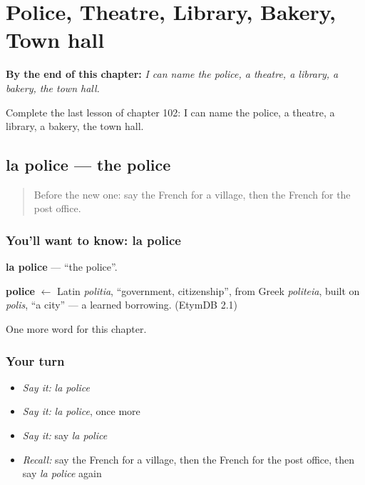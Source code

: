 
\chapter{Police, Theatre, Library, Bakery, Town hall}
\label{ch:fr-police-theatre-library-bakery-town-hall}

\begin{chapteropening}
\textbf{By the end of this chapter:} \emph{I can name the police, a theatre, a library, a bakery, the town hall.}

Complete the last lesson of chapter 102: I can name the police, a theatre, a library, a bakery, the town hall.
\end{chapteropening}

\section[la police]{la police — the police}

\label{lesson:FR-C102-police}



\begin{quote}
Before the new one: say the French for a village, then the French for the post office.
\end{quote}

\subsection*{You'll want to know: la police}
\textbf{la police} — \textquotedblleft{}the police\textquotedblright{}.

\begin{cousinweb}
\textbf{police} $\leftarrow$ Latin \emph{politia}, \textquotedblleft{}government, citizenship\textquotedblright{}, from Greek \emph{politeia}, built on \emph{polis}, \textquotedblleft{}a city\textquotedblright{} — a learned borrowing. (EtymDB 2.1)
\end{cousinweb}

\begin{grammarlens}[title={What you've built}]
One more word for this chapter.
\end{grammarlens}

\subsection*{Your turn}
\begin{itemize}
\raggedright
  \item \emph{Say it:} \emph{la police}
  \item \emph{Say it:} \emph{la police}, once more
  \item \emph{Say it:} say \emph{la police}
  \item \emph{Recall:} say the French for a village, then the French for the post office, then say \emph{la police} again
\end{itemize}

